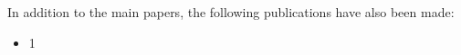 \noindent In addition to the main papers, the following publications have also been made:
\begin{itemize}

\item 1










\end{itemize}

